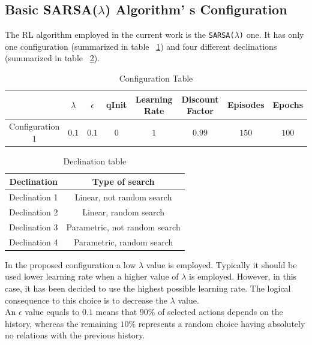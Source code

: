 \subsection{Basic SARSA($\lambda$) Algorithm' s Configuration} The RL algorithm employed in the current work is the {\tt SARSA($\lambda$)} one. It has only one configuration (summarized in table ~\ref{ConfigurationTable}) and four different declinations (summarized in table ~\ref{DeclinationTable}).

\begin{table} [h!]
	\centering
	\resizebox{\linewidth}{!} {	
	\begin{tabular}{|c||c|c|c|c|c|c|c|}
		\hline 
		& \textbf{$\lambda$}  & \textbf{$\epsilon$} & \textbf{qInit} & \textbf{Learning Rate} & \textbf{Discount Factor}  & \textbf{Episodes}  & \textbf{Epochs} \\
		\hline \hline Configuration $1$
		& $0.1$ & $0.1$ & $0$ & $1$ & $0.99$  & $150$ & $100$  \\ 
		\hline
	\end{tabular}
}
\caption{Configuration Table}
\label{ConfigurationTable}
\end{table}

\begin{table} [h!]
	\centering	
	\begin{tabular}{|c||c|}
		\hline \textbf{Declination}
		& \textbf{Type of search} \\ 
		\hline \hline Declination 1
		&  Linear, not random search\\ 
		\hline Declination 2
		& Linear, random search \\ 
		\hline Declination 3
		& Parametric, not random search \\ 
		\hline Declination 4
		&  Parametric, random search\\ 
		\hline 
	\end{tabular} 
\caption{Declination table}
\label{DeclinationTable}
\end{table}

In the proposed configuration a low $\lambda$ value is employed. Typically it should be used lower learning rate when a higher value of $\lambda$ is employed. However, in this case, it has been decided to use the highest possible learning rate. The logical consequence to this choice is to decrease the $\lambda$ value. \\

An $\epsilon$ value equals to $0.1$ means that $90\%$ of selected actions depends on the history, whereas the remaining $10\%$ represents a random choice having absolutely no relations with the previous history. \\ 


